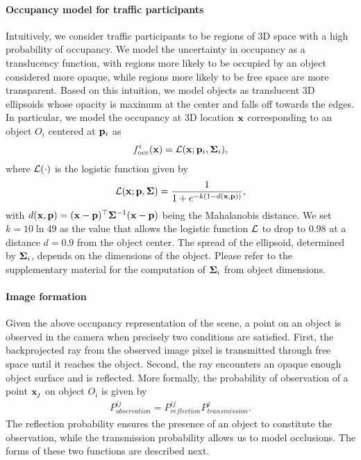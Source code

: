 \vspace{-0.3cm}
\paragraph{Occupancy model for traffic participants}
Intuitively, we consider traffic participants to be regions of 3D space with a high probability of occupancy. We model the uncertainty in occupancy as a translucency function, with regions more likely to be occupied by an object considered more opaque, while regions more likely to be free space are more transparent. Based on this intuition, we model objects as translucent 3D ellipsoids whose opacity is maximum at the center and falls off towards the edges. In particular, we model the occupancy at 3D location $\mathbf{x}$ corresponding to an object $O_i$ centered at $\mathbf{p}_i$ as
\begin{align}
  f^i_{\text{occ}}(\mathbf{x}) = \mathcal{L}(\mathbf{x}; \mathbf{p}_i, \bm{\Sigma}_i),
\end{align}
where $\mathcal{L}(\cdot)$ is the logistic function given by
\begin{align}
  \mathcal{L}(\mathbf{x}; \mathbf{p}, \bm{\Sigma}) = \frac{1}{1 + e^{-k(1 - d(\mathbf{x},\mathbf{p}))}},
\end{align}
with $d(\mathbf{x}, \mathbf{p}) = (\mathbf{x}-\mathbf{p})^\top\bm{\Sigma}^{-1}(\mathbf{x}-\mathbf{p})$ being the Mahalanobis distance. We set $k = 10\ln{49}$ as the value that allows the logistic function $\mathcal{L}$ to drop to $0.98$ at a distance $d = 0.9$ from the object center. The spread of the ellipsoid, determined by $\bm{\Sigma}_i$, depends on the dimensions of the object. Please refer to the supplementary material for the computation of $\bm{\Sigma}_i$ from object dimensions.


\vspace{-0.3cm}
\paragraph{Image formation}
Given the above occupancy representation of the scene, a point on an object is observed in the camera when precisely two conditions are satisfied. First, the backprojected ray from the observed image pixel is transmitted through free space until it reaches the object. Second, the ray encounters an opaque enough object surface and is reflected. More formally, the probability of observation of a point $\mathbf{x}_j$ on object $O_i$ is given by
\begin{align}
P^{ij}_{\textit{observation}} = P^{ij}_{\textit{reflection}}P^{j}_{\textit{transmission}}.
\label{eq:imgform}
\end{align}
The reflection probability ensures the presence of an object to constitute the observation, while the transmission probability allows us to model occlusions. The forms of these two functions are described next.


